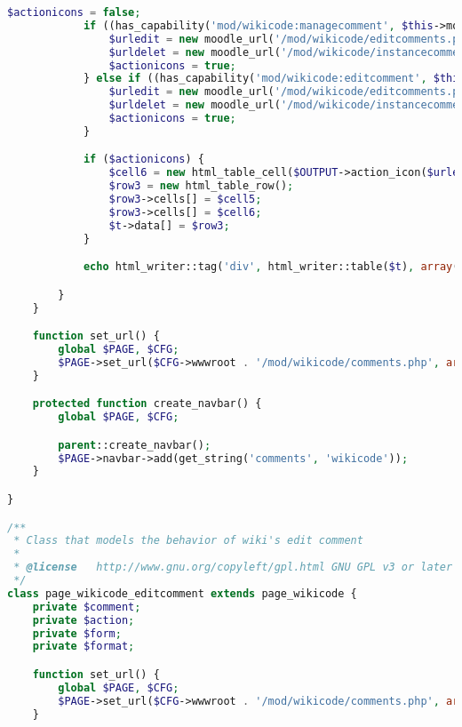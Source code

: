 \begin{lstlisting}[language=PHP]
            $actionicons = false;
            if ((has_capability('mod/wikicode:managecomment', $this->modcontext))) {
                $urledit = new moodle_url('/mod/wikicode/editcomments.php', array('commentid' => $comment->id, 'pageid' => $page->id, 'action' => 'edit'));
                $urldelet = new moodle_url('/mod/wikicode/instancecomments.php', array('commentid' => $comment->id, 'pageid' => $page->id, 'action' => 'delete'));
                $actionicons = true;
            } else if ((has_capability('mod/wikicode:editcomment', $this->modcontext)) and ($USER->id == $user->id)) {
                $urledit = new moodle_url('/mod/wikicode/editcomments.php', array('commentid' => $comment->id, 'pageid' => $page->id, 'action' => 'edit'));
                $urldelet = new moodle_url('/mod/wikicode/instancecomments.php', array('commentid' => $comment->id, 'pageid' => $page->id, 'action' => 'delete'));
                $actionicons = true;
            }

            if ($actionicons) {
                $cell6 = new html_table_cell($OUTPUT->action_icon($urledit, new pix_icon('t/edit', get_string('edit'))) . $OUTPUT->action_icon($urldelet, new pix_icon('t/delete', get_string('delete'))));
                $row3 = new html_table_row();
                $row3->cells[] = $cell5;
                $row3->cells[] = $cell6;
                $t->data[] = $row3;
            }

            echo html_writer::tag('div', html_writer::table($t), array('class'=>'no-overflow'));

        }
    }

    function set_url() {
        global $PAGE, $CFG;
        $PAGE->set_url($CFG->wwwroot . '/mod/wikicode/comments.php', array('pageid' => $this->page->id));
    }

    protected function create_navbar() {
        global $PAGE, $CFG;

        parent::create_navbar();
        $PAGE->navbar->add(get_string('comments', 'wikicode'));
    }

}

/**
 * Class that models the behavior of wiki's edit comment
 *
 * @license   http://www.gnu.org/copyleft/gpl.html GNU GPL v3 or later
 */
class page_wikicode_editcomment extends page_wikicode {
    private $comment;
    private $action;
    private $form;
    private $format;

    function set_url() {
        global $PAGE, $CFG;
        $PAGE->set_url($CFG->wwwroot . '/mod/wikicode/comments.php', array('pageid' => $this->page->id));
    }


\end{lstlisting}
